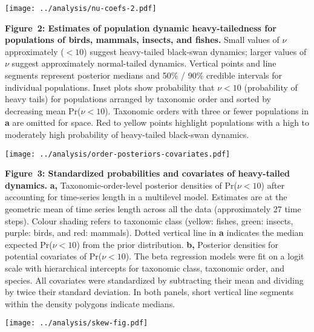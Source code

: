 \clearpage

\begin{center}
\texttt{[image: ../analysis/nu-coefs-2.pdf]}
\end{center}

\textbf{Figure~2: Estimates of population dynamic heavy-tailedness for populations of birds, mammals, insects, and fishes.} Small values of \(\nu\) approximately (\(< 10\)) suggest heavy-tailed black-swan dynamics; larger values of \(\nu\) suggest approximately normal-tailed dynamics. Vertical points and line segments represent posterior medians and 50\% / 90\% credible intervals for individual populations. Inset plots show probability that \(\nu < 10\) (probability of heavy tails) for populations arranged by taxonomic order and sorted by decreasing mean Pr(\(\nu < 10\)). Taxonomic orders with three or fewer populations in \textbf{a} are omitted for space. Red to yellow points highlight populations with a high to moderately high probability of heavy-tailed black-swan dynamics.

\clearpage

\begin{center}
\texttt{[image: ../analysis/order-posteriors-covariates.pdf]}
\end{center}

\textbf{Figure~3: Standardized probabilities and covariates of heavy-tailed dynamics.} \textbf{a,} Taxonomic-order-level posterior densities of Pr(\(\nu < 10\)) after accounting for time-series length in a multilevel model. Estimates are at the geometric mean of time series length across all the data (approximately 27 time steps). Colour shading refers to taxonomic class (yellow: fishes, green: insects, purple: birds, and red: mammals). Dotted vertical line in \textbf{a} indicates the median expected Pr(\(\nu < 10\)) from the prior distribution. \textbf{b,} Posterior densities for potential covariates of Pr(\(\nu < 10\)). The beta regression models were fit on a logit scale with hierarchical intercepts for taxonomic class, taxonomic order, and species. All covariates were standardized by subtracting their mean and dividing by twice their standard deviation. In both panels, short vertical line segments within the density polygons indicate medians.

\clearpage

\begin{center}
\texttt{[image: ../analysis/skew-fig.pdf]}
\end{center}

